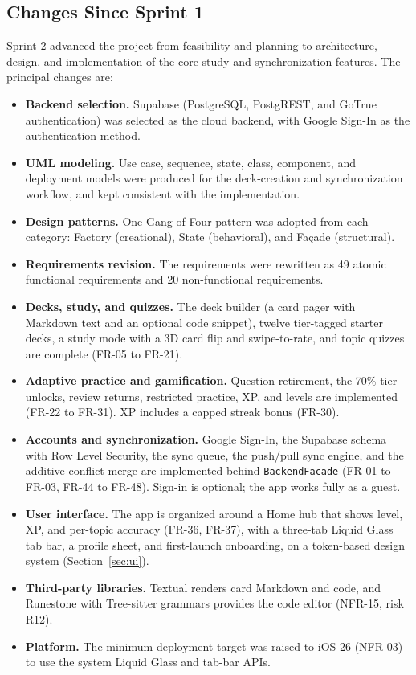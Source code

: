 \documentclass[12pt,letterpaper]{article}
\begin{document}
\subsection{Changes Since Sprint 1}
Sprint 2 advanced the project from feasibility and planning to architecture, design,
and implementation of the core study and synchronization features. The principal
changes are:
\begin{itemize}
  \item \textbf{Backend selection.} Supabase (PostgreSQL, PostgREST, and GoTrue
        authentication) was selected as the cloud backend, with Google Sign-In as the
        authentication method.
  \item \textbf{UML modeling.} Use case, sequence, state, class, component, and
        deployment models were produced for the deck-creation and synchronization
        workflow, and kept consistent with the implementation.
  \item \textbf{Design patterns.} One Gang of Four pattern was adopted from each
        category: Factory (creational), State (behavioral), and Fa\c{c}ade (structural).
  \item \textbf{Requirements revision.} The requirements were rewritten as 49 atomic
        functional requirements and 20 non-functional requirements.
  \item \textbf{Decks, study, and quizzes.} The deck builder (a card pager with
        Markdown text and an optional code snippet), twelve tier-tagged starter decks,
        a study mode with a 3D card flip and swipe-to-rate, and topic quizzes are
        complete (FR-05 to FR-21).
  \item \textbf{Adaptive practice and gamification.} Question retirement, the
        70\% tier unlocks, review returns, restricted practice, XP, and levels are
        implemented (FR-22 to FR-31). XP includes a capped streak bonus (FR-30).
  \item \textbf{Accounts and synchronization.} Google Sign-In, the Supabase schema
        with Row Level Security, the sync queue, the push/pull sync engine, and the
        additive conflict merge are implemented behind \texttt{BackendFacade}
        (FR-01 to FR-03, FR-44 to FR-48). Sign-in is optional; the app works fully
        as a guest.
  \item \textbf{User interface.} The app is organized around a Home hub that shows
        level, XP, and per-topic accuracy (FR-36, FR-37), with a three-tab Liquid Glass
        tab bar, a profile sheet, and first-launch onboarding, on a token-based design
        system (Section~\ref{sec:ui}).
  \item \textbf{Third-party libraries.} Textual renders card Markdown and code, and
        Runestone with Tree-sitter grammars provides the code editor (NFR-15,
        risk R12).
  \item \textbf{Platform.} The minimum deployment target was raised to iOS 26
        (NFR-03) to use the system Liquid Glass and tab-bar APIs.
\end{itemize}
\end{document}
